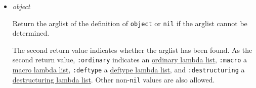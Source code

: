 \begin{itemize}
\item
  \label{x-28DREF-3AARGLIST-20FUNCTION-29}
  \emph{object}

  Return the arglist of the definition of \texttt{object} or
  \texttt{nil} if the arglist cannot be determined.

  The second return value indicates whether the arglist has been found.
  As the second return value, \texttt{:ordinary} indicates an
  \href{http://www.lispworks.com/documentation/HyperSpec/Body/26_glo_o.htm\#ordinary_lambda_list}{ordinary
  lambda list}, \texttt{:macro} a
  \href{http://www.lispworks.com/documentation/HyperSpec/Body/26_glo_m.htm\#macro_lambda_list}{macro
  lambda list}, \texttt{:deftype} a
  \href{http://www.lispworks.com/documentation/HyperSpec/Body/26_glo_d.htm\#deftype_lambda_list}{deftype
  lambda list}, and \texttt{:destructuring} a
  \href{http://www.lispworks.com/documentation/HyperSpec/Body/26_glo_d.htm\#destructuring_lambda_list}{destructuring
  lambda list}. Other non-\texttt{nil} values are also allowed.

\begin{Shaded}
\begin{Highlighting}[]
\OperatorTok{\#\textquotesingle{}}
\OperatorTok{=\textgreater{}}
\OperatorTok{=\textgreater{}}
\end{Highlighting}
\end{Shaded}

\begin{Shaded}
\begin{Highlighting}[]
 \NormalTok{))}
\OperatorTok{=\textgreater{}}
\OperatorTok{=\textgreater{}}
\end{Highlighting}
\end{Shaded}

\begin{Shaded}
\begin{Highlighting}[]
 \NormalTok{))}
\OperatorTok{=\textgreater{}}
\OperatorTok{=\textgreater{}}
\end{Highlighting}
\end{Shaded}


\end{itemize}
